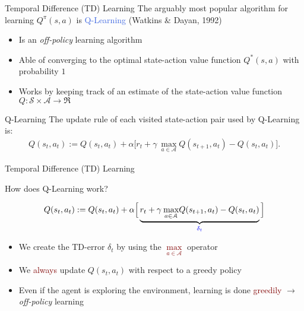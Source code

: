 \documentclass{beamer}
\begin{document}
\begin{frame}{Temporal Difference (TD) Learning}
	The arguably most popular algorithm for learning $Q^{\pi}(s,a)$ is \textcolor{RoyalBlue}{Q-Learning} (Watkins \& Dayan, 1992)

	\begin{itemize}
		\item Is an \textit{off-policy} learning algorithm 
		\item Able of converging to the optimal state-action value function $Q^{*}(s,a)$ with probability $1$
		\item Works by keeping track of an estimate of the state-action value function $Q: \mathcal{S} \times \mathcal{A} \rightarrow \Re$
	\end{itemize}

	\begin{block}{Q-Learning}
		The update rule of each visited state-action pair used by Q-Learning is:
		\begin{align*}
			Q(s_t,a_t):=Q(s_t,a_t) + \alpha\Big[r_t + \gamma \:\underset{a\in \mathcal{A}}{\max} Q(s_{t+1},a_t) - Q(s_t, a_t) \Big].
		\end{align*}
	\end{block}

\end{frame}

\begin{frame}{Temporal Difference (TD) Learning}

	How does Q-Learning work?

	\begin{align*}
		Q(s_t,a_t):=Q(s_t,a_t) + \alpha\Big[\underbrace{r_t + \gamma \:\underset{a\in \mathcal{A}}{\max} Q(s_{t+1},a_t) - Q(s_t, a_t)}_{\textcolor{blue}{\delta_t}}\Big]
	\end{align*}

	\begin{itemize}
		\item \onslide<+-> We create the TD-error $\delta_t$ by using the \textcolor{Maroon}{$\underset{a\in \mathcal{A}}{\max}$} operator 
		\item \onslide<+-> We \textcolor{Maroon}{always} update $Q(s_t,a_t)$ with respect to a greedy policy
		\item \onslide<+-> Even if the agent is exploring the environment, learning is done \textcolor{Maroon}{greedily} $\rightarrow$ \textit{off-policy} learning
	\end{itemize}

\end{frame}
\end{document}
